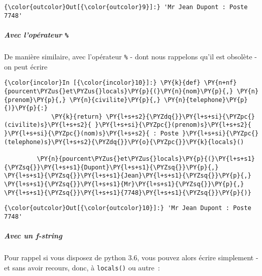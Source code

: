 \begin{Verbatim}[commandchars=\\\{\}]
{\color{outcolor}Out[{\color{outcolor}9}]:} 'Mr Jean Dupont : Poste 7748'
\end{Verbatim}
            
    \hypertarget{avec-lopuxe9rateur}{%
\subparagraph{\texorpdfstring{Avec l'opérateur
\texttt{\%}}{Avec l'opérateur \%}}\label{avec-lopuxe9rateur}}

    De manière similaire, avec l'opérateur \texttt{\%} - dont nous rappelons
qu'il est obsolète - on peut écrire

    \begin{Verbatim}[commandchars=\\\{\}]
{\color{incolor}In [{\color{incolor}10}]:} \PY{k}{def} \PY{n+nf}{pourcent\PYZus{}et\PYZus{}locals}\PY{p}{(}\PY{n}{nom}\PY{p}{,} \PY{n}{prenom}\PY{p}{,} \PY{n}{civilite}\PY{p}{,} \PY{n}{telephone}\PY{p}{)}\PY{p}{:}
             \PY{k}{return} \PY{l+s+s2}{\PYZdq{}}\PY{l+s+si}{\PYZpc{}(civilite)s}\PY{l+s+s2}{ }\PY{l+s+si}{\PYZpc{}(prenom)s}\PY{l+s+s2}{ }\PY{l+s+si}{\PYZpc{}(nom)s}\PY{l+s+s2}{ : Poste }\PY{l+s+si}{\PYZpc{}(telephone)s}\PY{l+s+s2}{\PYZdq{}}\PY{o}{\PYZpc{}}\PY{k}{locals}()
         
         \PY{n}{pourcent\PYZus{}et\PYZus{}locals}\PY{p}{(}\PY{l+s+s1}{\PYZsq{}}\PY{l+s+s1}{Dupont}\PY{l+s+s1}{\PYZsq{}}\PY{p}{,} \PY{l+s+s1}{\PYZsq{}}\PY{l+s+s1}{Jean}\PY{l+s+s1}{\PYZsq{}}\PY{p}{,} \PY{l+s+s1}{\PYZsq{}}\PY{l+s+s1}{Mr}\PY{l+s+s1}{\PYZsq{}}\PY{p}{,} \PY{l+s+s1}{\PYZsq{}}\PY{l+s+s1}{7748}\PY{l+s+s1}{\PYZsq{}}\PY{p}{)}
\end{Verbatim}


\begin{Verbatim}[commandchars=\\\{\}]
{\color{outcolor}Out[{\color{outcolor}10}]:} 'Mr Jean Dupont : Poste 7748'
\end{Verbatim}
            
    \hypertarget{avec-un-f-string}{%
\subparagraph{\texorpdfstring{Avec un
\emph{f-string}}{Avec un f-string}}\label{avec-un-f-string}}

    Pour rappel si vous disposez de python 3.6, vous pouvez alors écrire
simplement - et sans avoir recours, donc, à \texttt{locals()} ou autre~:

